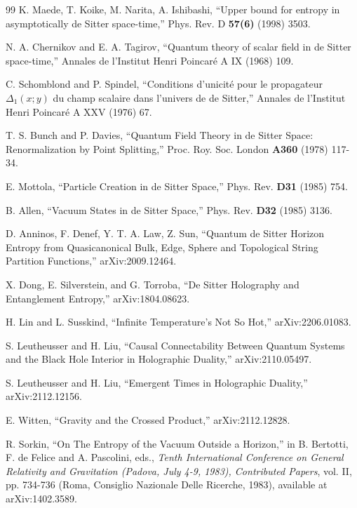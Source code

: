 \documentclass[11pt,a4paper]{article}
\begin{document}
\begin{thebibliography}{99}
 K. Maede, T. Koike, M. Narita, A. Ishibashi, ``Upper bound for entropy in asymptotically de Sitter space-time,'' Phys. Rev. D {\bf 57(6)} (1998) 3503.






 N. A. Chernikov and E. A. Tagirov, ``Quantum theory of scalar field in de Sitter space-time,''
Annales de l'Institut Henri Poincar\'{e} A IX (1968) 109.

C. Schomblond and P. Spindel,  ``Conditions d'unicit\'{e}
pour le propagateur $\Delta_1(x;y)$  du champ scalaire dans l'univers de de Sitter,''  Annales de l'Institut Henri Poincar\'{e} A XXV (1976) 67.


T. S. Bunch and P. Davies,
``Quantum Field Theory in de Sitter Space:
Renormalization by Point Splitting,'' Proc. Roy. Soc. London {\bf A360} (1978) 117-34.

E. Mottola, ``Particle Creation in de Sitter Space,'' Phys. Rev. {\bf D31} (1985) 754.

B. Allen, ``Vacuum States in de Sitter Space,'' Phys. Rev. {\bf D32} (1985) 3136.

D. Anninos, F. Denef, Y. T. A. Law, Z. Sun, ``Quantum de Sitter Horizon
Entropy from Quasicanonical Bulk, Edge, Sphere and
Topological String Partition Functions,'' arXiv:2009.12464.

X. Dong, E. Silverstein, and G. Torroba,
``De Sitter Holography and Entanglement Entropy,''
arXiv:1804.08623.

H. Lin and L. Susskind, ``Infinite Temperature's Not So Hot,'' arXiv:2206.01083.

S. Leutheusser and H. Liu, ``Causal Connectability Between Quantum Systems and the Black Hole
Interior in Holographic Duality,'' arXiv:2110.05497.

S. Leutheusser and H. Liu, ``Emergent Times in Holographic Duality,'' 
arXiv:2112.12156.

E. Witten, ``Gravity and the Crossed Product,'' arXiv:2112.12828.



R. Sorkin, ``On  The Entropy of the Vacuum Outside a Horizon,'' in B. Bertotti, F. de Felice and A. Pascolini, eds.,
  {\it Tenth International Conference on General Relativity and Gravitation (Padova, July 4-9, 1983), Contributed Papers}, 
  vol. II, pp. 734-736
  (Roma, Consiglio Nazionale Delle Ricerche, 1983), available at arXiv:1402.3589.


\end{thebibliography}
\end{document}

